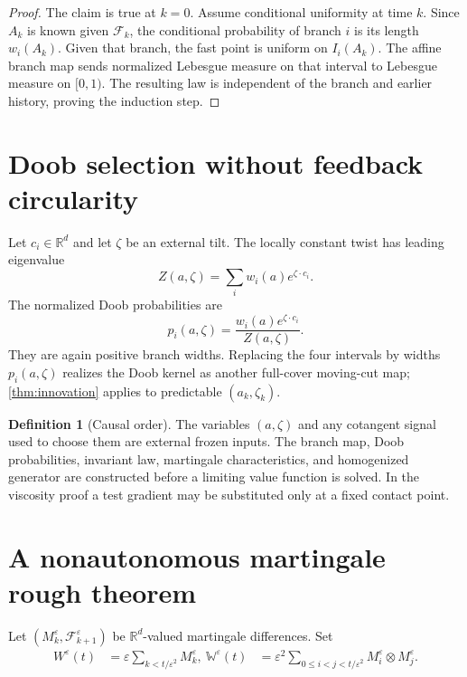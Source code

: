 \documentclass[11pt,reqno]{amsart}
\theoremstyle{definition}
\newtheorem{definition}[theorem]{Definition}
\theoremstyle{remark}
\newcommand{\F}{\mathcal F}
\newcommand{\R}{\mathbb R}
\begin{document}
\begin{proof}
The claim is true at $k=0$.  Assume conditional uniformity at time $k$.
Since $A_k$ is known given $\F_k$, the conditional probability of branch $i$
is its length $w_i(A_k)$.  Given that branch, the fast point is uniform on
$I_i(A_k)$.  The affine branch map sends normalized Lebesgue measure on that
interval to Lebesgue measure on $[0,1)$.  The resulting law is independent of
the branch and earlier history, proving the induction step.
\end{proof}

\section{Doob selection without feedback circularity}\label{sec:doob}

Let $c_i\in\R^d$ and let $\zeta$ be an external tilt.  The locally constant
twist has leading eigenvalue
\[
 Z(a,\zeta)=\sum_iw_i(a)e^{\zeta\cdot c_i}.
\]
The normalized Doob probabilities are
\begin{equation}\label{eq:doob-prob}
 p_i(a,\zeta)=
 \frac{w_i(a)e^{\zeta\cdot c_i}}{Z(a,\zeta)}.
\end{equation}
They are again positive branch widths.  Replacing the four intervals by widths
$p_i(a,\zeta)$ realizes the Doob kernel as another full-cover moving-cut map;
\cref{thm:innovation} applies to predictable $(a_k,\zeta_k)$.

\begin{definition}[Causal order]
The variables $(a,\zeta)$ and any cotangent signal used to choose them are
external frozen inputs.  The branch map, Doob probabilities, invariant law,
martingale characteristics, and homogenized generator are constructed before
a limiting value function is solved.  In the viscosity proof a test gradient
may be substituted only at a fixed contact point.
\end{definition}

\section{A nonautonomous martingale rough theorem}\label{sec:rough}

Let $(M_k^\varepsilon,\F_{k+1}^\varepsilon)$ be $\R^d$-valued martingale
differences.  Set
\begin{align}
 W^\varepsilon(t)&=\varepsilon
 \sum_{k<t/\varepsilon^2}M_k^\varepsilon,
 \label{eq:W}\
 \mathbb W^\varepsilon(t)&=\varepsilon^2
 \sum_{0\le i<j<t/\varepsilon^2}
 M_i^\varepsilon\otimes M_j^\varepsilon.
 \label{eq:WW}
\end{align}
\end{document}
